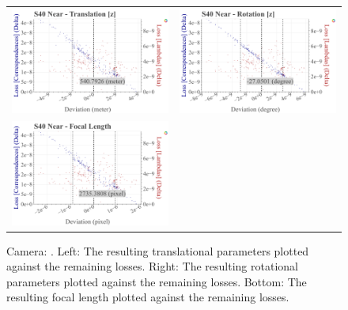 \begin{figure}[!ht]
\begin{tabular}{cc}
    \includegraphics[width=0.45 \linewidth]{diagrams/calibration/s40_n_near/parameters.csv/Translation[z]_vs_Loss[Correspondences]_vs_Loss[Lambdas]_cluster_All.png} &
    \includegraphics[width=0.45 \linewidth]{diagrams/calibration/s40_n_near/parameters.csv/Rotation[z]_vs_Loss[Correspondences]_vs_Loss[Lambdas]_cluster_All.png} \\

    \includegraphics[width=0.45 \linewidth]{diagrams/calibration/s40_n_near/parameters.csv/FocalLength_vs_Loss[Correspondences]_vs_Loss[Lambdas]_cluster_All.png} &
\end{tabular}
\caption{
  Camera: .
  Left: The resulting translational parameters plotted against the remaining losses. 
  Right: The resulting rotational parameters plotted against the remaining losses.
  Bottom: The resulting focal length  plotted against the remaining losses.
     }
\label{fig:static_calibration_algorithmic_error_s40_n_near}
\end{figure}

